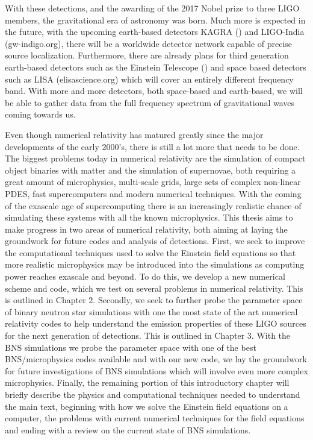 With these detections, and the awarding of the 2017 Nobel prize to three LIGO members, the gravitational era of astronomy was born. Much more is expected in the future, with the upcoming earth-based detectors KAGRA (\cite{somiya2012detector}) and LIGO-India (gw-indigo.org), there will be a worldwide detector network capable of precise source localization. Furthermore, there are already plans for third generation earth-based detectors such as the Einstein Telescope (\cite{einsteintelescope}) and space based detectors such as LISA (elisascience.org) which will cover an entirely different frequency band. With more and more detectors, both space-based and earth-based, we will be able to gather data from the full frequency spectrum of gravitational waves coming towards us.

Even though numerical relativity has matured greatly since the major developments of the early 2000's, there is still a lot more that needs to be done. The biggest problems today in numerical relativity are the simulation of compact object binaries with matter and the simulation of supernovae, both requiring a great amount of microphysics, multi-scale grids, large sets of complex non-linear PDES, fast supercomputers and modern numerical techniques. With the coming of the exascale age of supercomputing there is an increasingly realistic chance of simulating these systems with all the known microphysics. This thesis aims to make progress in two areas of numerical relativity, both aiming at laying the groundwork for future codes and analysis of detections. First, we seek to improve the computational techniques used to solve the Einstein field equations so that more realistic microphysics may be introduced into the simulations as computing power reaches exascale and beyond. To do this, we develop a new numerical scheme and code, which we test on several problems in numerical relativity. This is outlined in Chapter 2. Secondly, we seek to further probe the parameter space of binary neutron star simulations with one the most state of the art numerical relativity codes to help understand the emission properties of these LIGO sources for the next generation of detections. This is outlined in Chapter 3. With the BNS simulations we probe the parameter space with one of the best BNS/microphysics codes available and with our new code, we lay the groundwork for future investigations of BNS simulations which will involve even more complex microphysics. Finally, the remaining portion of this introductory chapter will briefly describe the physics and computational techniques needed to understand the main text, beginning with how we solve the Einstein field equations on a computer, the problems with current numerical techniques for the field equations and ending with a review on the current state of BNS simulations.

